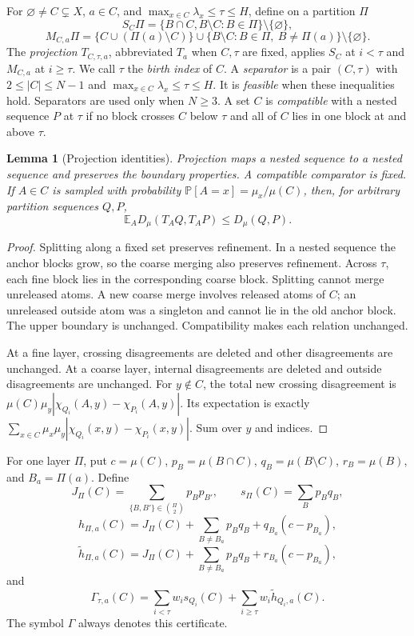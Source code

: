 \documentclass[11pt]{article}
\newtheorem{lemma}[theorem]{Lemma}
\theoremstyle{definition}
\newcommand{\E}{\mathbb E}
\newcommand{\Prb}{\mathbb P}
\newcommand{\join}{\chi}
\begin{document}
For $\varnothing\ne C\subsetneq X$, $a\in C$, and
$\max_{x\in C}\lambda_x\le\tau\le H$, define on a partition $\Pi$
\[
 S_C\Pi=\{B\cap C,B\setminus C:B\in\Pi\}\setminus\{\varnothing\},
\]
\[
 M_{C,a}\Pi=\{C\cup(\Pi(a)\setminus C)\}
 \cup\{B\setminus C:B\in\Pi,\ B\ne\Pi(a)\}\setminus\{\varnothing\}.
\]
The \emph{projection} $T_{C,\tau,a}$, abbreviated $T_a$ when $C,\tau$
are fixed, applies $S_C$ at $i<\tau$ and $M_{C,a}$ at $i\ge\tau$.
We call $\tau$ the \emph{birth index} of $C$. A \emph{separator} is a
pair $(C,\tau)$ with $2\le |C|\le N-1$ and
$\max_{x\in C}\lambda_x\le\tau\le H$. It is \emph{feasible} when
these inequalities hold. Separators are used only when $N\ge3$.
A set $C$ is \emph{compatible} with a nested sequence $P$ at $\tau$
if no block crosses $C$ below $\tau$ and all of $C$ lies in one block
at and above $\tau$.

\begin{lemma}[Projection identities]\label{lem:projection}
Projection maps a nested sequence to a nested sequence and preserves
the boundary properties. A compatible
comparator is fixed. If $A\in C$ is sampled with probability
$\Prb[A=x]=\mu_x/\mu(C)$, then, for arbitrary partition sequences $Q,P$,
\[
 \E_A D_\mu(T_AQ,T_AP)\le D_\mu(Q,P).
\]
\end{lemma}
\begin{proof}
Splitting along a fixed set preserves refinement. In a nested sequence
the anchor blocks grow, so the coarse merging also preserves refinement.
Across $\tau$, each fine block lies in the corresponding coarse block.
Splitting cannot merge unreleased atoms. A new coarse merge involves
released atoms of $C$; an unreleased outside atom was a singleton and
cannot lie in the old anchor block. The upper boundary is unchanged.
Compatibility makes each relation unchanged.

At a fine layer, crossing disagreements are deleted and other
disagreements are unchanged. At a coarse layer, internal disagreements
are deleted and outside disagreements are unchanged. For $y\notin C$,
the total new crossing disagreement is
$\mu(C)\mu_y|\join_{Q_i}(A,y)-\join_{P_i}(A,y)|$. Its expectation is exactly
$\sum_{x\in C}\mu_x\mu_y|\join_{Q_i}(x,y)-\join_{P_i}(x,y)|$.
Sum over $y$ and indices.
\end{proof}

For one layer $\Pi$, put $c=\mu(C)$,
$p_B=\mu(B\cap C)$, $q_B=\mu(B\setminus C)$, $r_B=\mu(B)$, and
$B_a=\Pi(a)$. Define
\[
 J_\Pi(C)=\sum_{\{B,B'\}\in\binom\Pi2}p_Bp_{B'},\qquad
 s_\Pi(C)=\sum_Bp_Bq_B,
\]
\[
 h_{\Pi,a}(C)=J_\Pi(C)+\sum_{B\ne B_a}p_Bq_B+q_{B_a}(c-p_{B_a}),
\]
\[
 \widetilde h_{\Pi,a}(C)=J_\Pi(C)+\sum_{B\ne B_a}p_Bq_B+r_{B_a}(c-p_{B_a}),
\]
and
\[
 \Gamma_{\tau,a}(C)=\sum_{i<\tau}w_is_{Q_i}(C)
             +\sum_{i\ge\tau}w_i\widetilde h_{Q_i,a}(C).
\]
The symbol $\Gamma$ always denotes this certificate.
\end{document}
